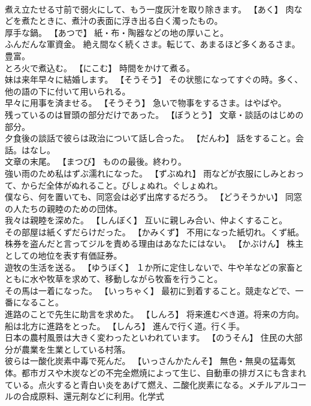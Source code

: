 \documentclass[8pt]{extreport}
\begin{document}
\begin{CJK}{UTF8}{min}
\\	煮え立たせる寸前で弱火にして、もう一度灰汁を取り除きます。	【あく】 肉などを煮たときに、煮汁の表面に浮き出る白く濁ったもの。
\\	厚手な鍋。	【あつで】 紙・布・陶器などの地の厚いこと。
\\	ふんだんな軍資金。	絶え間なく続くさま。転じて、あまるほど多くあるさま。豊富。
\\	とろ火で煮込む。	【にこむ】 時間をかけて煮る。
\\	妹は来年早々に結婚します。	【そうそう】 その状態になってすぐの時。多く、他の語の下に付いて用いられる。
\\	早々に用事を済ませる。	【そうそう】 急いで物事をするさま。はやばや。
\\	残っているのは冒頭の部分だけであった。	【ぼうとう】 文章・談話のはじめの部分。
\\	夕食後の談話で彼らは政治について話し合った。	【だんわ】 話をすること。会話。はなし。
\\	文章の末尾。	【まつび】 ものの最後。終わり。
\\	強い雨のため私はずぶ濡れになった。	【ずぶぬれ】 雨などが衣服にしみとおって、からだ全体がぬれること。びしょぬれ。ぐしょぬれ。
\\	僕なら、何を置いても、同窓会は必ず出席するだろう。	【どうそうかい】 同窓の人たちの親睦のための団体。
\\	我々は親睦を深めた。	【しんぼく】 互いに親しみ合い、仲よくすること。
\\	その部屋は紙くずだらけだった。	【かみくず】 不用になった紙切れ。くず紙。
\\	株券を盗んだと言ってジルを責める理由はあなたにはない。	【かぶけん】 株主としての地位を表す有価証券。
\\	遊牧の生活を送る。	【ゆうぼく】 １か所に定住しないで、牛や羊などの家畜とともに水や牧草を求めて、移動しながら牧畜を行うこと。
\\	その馬は一着になった。	【いっちゃく】 最初に到着すること。競走などで、一番になること。
\\	進路のことで先生に助言を求めた。	【しんろ】 将来進むべき道。将来の方向。
\\	船は北方に進路をとった。	【しんろ】 進んで行く道。行く手。
\\	日本の農村風景は大きく変わったといわれています。	【のうそん】 住民の大部分が農業を生業としている村落。
\\	彼らは一酸化炭素中毒で死んだ。	【いっさんかたんそ】 無色・無臭の猛毒気体。都市ガスや木炭などの不完全燃焼によって生じ、自動車の排ガスにも含まれている。点火すると青白い炎をあげて燃え、二酸化炭素になる。メチルアルコールの合成原料、還元剤などに利用。化学式

\end{CJK}
\end{document}
